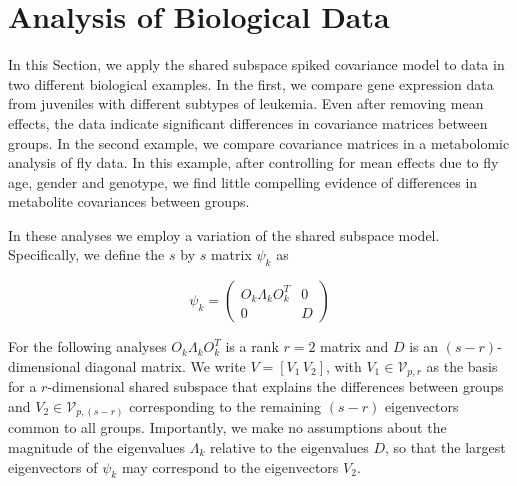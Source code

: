 \documentclass{article}
\begin{document}


\section{Analysis of Biological Data}
\label{sec:app}

In this Section, we apply the shared subspace spiked covariance model to data in two
different biological examples.  In the first, we compare gene
expression data from juveniles with different subtypes of leukemia.  Even
after removing mean effects, the data indicate significant differences
in covariance matrices between groups.  In the second example, we
compare covariance matrices in a metabolomic analysis of fly data.  In
this example, after controlling for mean effects due to fly age, gender and
genotype, we find little compelling evidence of differences in metabolite
covariances between groups. 

In these analyses we employ a variation of the shared
subspace model.  Specifically, we define the $s$ by $s$ matrix $\psi_k$ as

\begin{equation}
\psi_k =\left( \begin{array}{cc}
O_k\Lambda_kO_k^T & 0  \\
0 & D  \end{array} \right)
\end{equation}

For the following analyses $O_k\Lambda_kO_k^T$ is a rank $r=2$ matrix
and $D$ is an $(s-r)$-dimensional diagonal matrix.  We write
$V = [V_1\, V_2]$, with $V_1 \in \mathcal{V}_{p,r}$ as the basis for a
$r$-dimensional shared subspace that explains the differences between
groups and $V_2 \in \mathcal{V}_{p,(s-r)}$ corresponding to the remaining $(s-r)$
eigenvectors common to all groups.  Importantly, we make no assumptions about the
magnitude of the eigenvalues $\Lambda_k$ relative to the eigenvalues
$D$, so that the largest eigenvectors of $\psi_k$ may correspond to
the eigenvectors $V_2$.  
\end{document}
